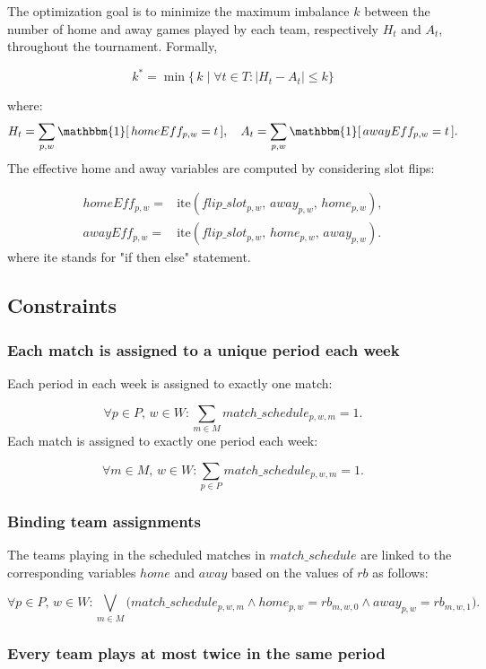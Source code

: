 The optimization goal is to minimize the maximum imbalance $k$ between the number of home and away games played by each team, respectively $H_t$ and $A_t$, throughout the tournament. Formally,

\[
k^* = \min \big\{\, k \mid \forall t \in T : |H_t - A_t| \leq k \big\}
\]

where:
\[
H_t = \sum_{p,w} \mathbbm{1}[\,homeEff_{p,w} = t\,], 
\quad
A_t = \sum_{p,w} \mathbbm{1}[\,awayEff_{p,w} = t\,].
\]
The effective home and away variables are computed by considering slot flips:

\begin{align*}
homeEff_{p,w} =& \text{ite}(flip\_slot_{p,w},\, away_{p,w},\, home_{p,w}), \\
awayEff_{p,w} =& \text{ite}(flip\_slot_{p,w},\, home_{p,w},\, away_{p,w}).
\end{align*}
where ite stands for "if then else" statement.

\subsection{Constraints}

\subsubsection{Each match is assigned to a unique period each week}

Each period in each week is assigned to exactly one match:

\[
\forall p \in P,\, w \in W: 
\sum_{m \in M} match\_schedule_{p,w,m} = 1.
\]
Each match is assigned to exactly one period each week:

\[
\forall m \in M,\, w \in W: 
\sum_{p \in P} match\_schedule_{p,w,m} = 1.
\]

\subsubsection{Binding team assignments}
The teams playing in the scheduled matches in $match\_schedule$ are linked to the corresponding variables $home$ and $away$ based on the values of $rb$ as follows:

\[
\forall p \in P,\, w \in W: 
\bigvee_{m \in M} \big(
match\_schedule_{p,w,m} \wedge home_{p,w} = rb_{m,w,0} \wedge away_{p,w} = rb_{m,w,1}
\big).
\]

\subsubsection{Every team plays at most twice in the same period}

